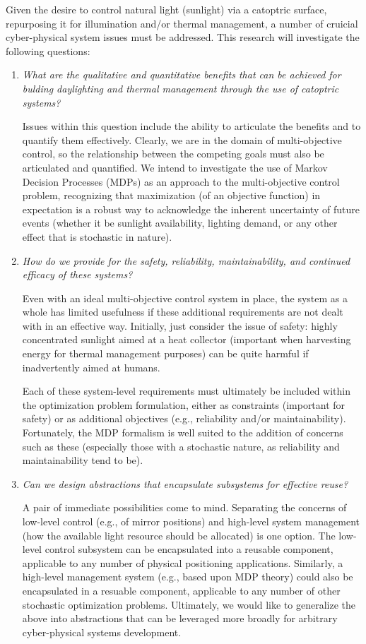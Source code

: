 Given the desire to control natural light (sunlight) via a catoptric surface,
repurposing it for illumination and/or thermal management, a number of
cruicial cyber-physical system issues must be addressed.
This research will investigate the following questions:
\begin{enumerate}

\item \emph{What are the qualitative and quantitative benefits
that can be achieved for bulding daylighting and thermal management
through the use of catoptric systems?}

Issues within this question include the ability to articulate the benefits
and to quantify them effectively.  Clearly, we are in the domain
of multi-objective control, so the relationship between the competing
goals must also be articulated and quantified. We intend to investigate
the use of Markov Decision Processes (MDPs) as an approach to
the multi-objective control problem, recognizing that maximization
(of an objective function) in expectation is a robust way to acknowledge
the inherent uncertainty of future events (whether it be sunlight availability,
lighting demand, or any other effect that is stochastic in nature).

\item \emph{How do we provide for the safety, reliability, maintainability, and
continued efficacy of these systems?}

Even with an ideal multi-objective control system in place, the system as
a whole has limited usefulness if these additional requirements are not
dealt with in an effective way.  Initially, just consider the issue of
safety: highly concentrated sunlight aimed at a heat collector (important
when harvesting energy for thermal management purposes) can be quite harmful
if inadvertently aimed at humans. 

Each of these system-level requirements must ultimately be included within
the optimization problem formulation, either as constraints (important for
safety) or as additional objectives (e.g., reliability and/or maintainability).
Fortunately, the MDP formalism is well suited to the addition of concerns
such as these (especially those with a stochastic nature, as reliability
and maintainability tend to be).

\item \emph{Can we design abstractions that encapsulate subsystems for
effective reuse?}

A pair of immediate possibilities come to mind. Separating the concerns
of low-level control (e.g., of mirror positions) and high-level system
management (how the available light resource should be allocated) is one
option.  The low-level control subsystem can be encapsulated into a reusable
component, applicable to any number of physical positioning applications.
Similarly, a high-level management system (e.g., based upon MDP theory)
could also be encapsulated in a resuable component, applicable to any
number of other stochastic optimization problems.
Ultimately, we would like to generalize the above into abstractions that can be
leveraged more broadly for arbitrary cyber-physical systems development.

\end{enumerate}

